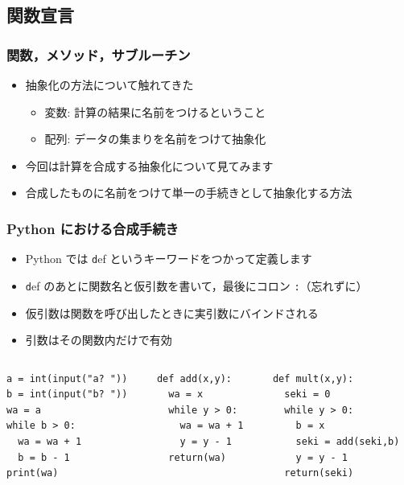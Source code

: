 \subsection{関数宣言}
\begin{frame}[containsverbatim,label=function,shrink]
\frametitle{関数，メソッド，サブルーチン}
  \begin{itemize}
\item 抽象化の方法について触れてきた
    \begin{itemize}
\item 変数: 計算の結果に名前をつけるということ
\item 配列: データの集まりを名前をつけて抽象化
    \end{itemize}
\item 今回は計算を合成する抽象化について見てみます
\item 合成したものに名前をつけて単一の手続きとして抽象化する方法
  \end{itemize}
\end{frame}
\begin{frame}
\frametitle{Python における合成手続き}
  \begin{itemize}
\item Python では {\texttt def} というキーワードをつかって定義します
\item {\texttt def} のあとに関数名と仮引数を書いて，最後にコロン {\texttt :}（忘れずに）
\item 仮引数は関数を呼び出したときに実引数にバインドされる
\item 引数はその関数内だけで有効
  \end{itemize}
  \begin{columns}[t]
    \begin{column}{0.35\textwidth}
      \begin{lstlisting}[caption={add.py},label=lst:definefun]
a = int(input("a? "))
b = int(input("b? "))
wa = a
while b > 0:
  wa = wa + 1
  b = b - 1
print(wa)
      \end{lstlisting}
    \end{column}
    \begin{column}{0.3\textwidth}
      \begin{lstlisting}[caption={関数定義},label=lst:definefun2]
def add(x,y):
  wa = x 
  while y > 0:
    wa = wa + 1
    y = y - 1
  return(wa)
      \end{lstlisting}
    \end{column}
    \begin{column}{0.3\textwidth}
      \begin{lstlisting}[caption={関数適用},label=lst:definefun3,firstnumber=last]
def mult(x,y):
  seki = 0
  while y > 0:
    b = x
    seki = add(seki,b)
    y = y - 1
  return(seki)
      \end{lstlisting}
    \end{column}
  \end{columns}
\end{frame}
